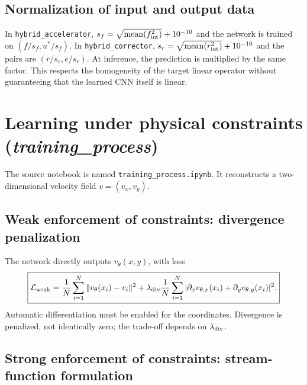 \documentclass[11pt,a4paper]{article}
\begin{document}
\subsection{Normalization of input and output data}

In \texttt{hybrid\_accelerator}, $s_f=\sqrt{\operatorname{mean}(f_{\rm int}^2)}+10^{-10}$ and the network is trained on $(f/s_f,u^*/s_f)$. In \texttt{hybrid\_corrector}, $s_r=\sqrt{\operatorname{mean}(r_{\rm int}^2)}+10^{-10}$ and the pairs are $(r/s_r,e/s_r)$. At inference, the prediction is multiplied by the same factor. This respects the homogeneity of the target linear operator without guaranteeing that the learned CNN itself is linear.

\section{Learning under physical constraints (\textit{training\_process})}

The source notebook is named \texttt{training\_process.ipynb}. It reconstructs a two-dimensional velocity field $v=(v_x,v_y)$.

\subsection{Weak enforcement of constraints: divergence penalization}

The network directly outputs $v_\theta(x,y)$, with loss
\[\boxed{\mathcal L_{\rm weak}=\frac1N\sum_{i=1}^N\|v_\theta(x_i)-v_i\|^2+\lambda_{\rm div}\frac1N\sum_{i=1}^N|\partial_x v_{\theta,x}(x_i)+\partial_y v_{\theta,y}(x_i)|^2.}\]
Automatic differentiation must be enabled for the coordinates. Divergence is penalized, not identically zero; the trade-off depends on $\lambda_{\rm div}$.

\subsection{Strong enforcement of constraints: stream-function formulation}
\end{document}
